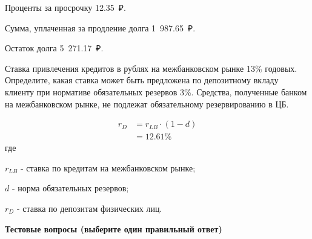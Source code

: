 \documentclass[12pt, table]{exam}
\begin{document}
\begin{questions}
\begin{subparts}
\begin{solution}[6em]
		Проценты за просрочку 12.35~₽.
		
		Сумма, уплаченная за продление долга 1~987.65~₽. 
		
		Остаток долга 5~271.17~₽.
	\end{solution}
	
\end{subparts}
\addpoints

\pagebreak
\question[10] Ставка привлечения кредитов в рублях на межбанковском рынке 13\% годовых. Определите, какая ставка может быть предложена по депозитному вкладу клиенту при нормативе обязательных резервов 3\%. Средства, полученные банком на межбанковском рынке, не подлежат обязательному резервированию в ЦБ.
\begin{solution}[10em]
	\begin{align}
	r_D&=r_{LB} \cdot (1-d)\\
	&=12.61\%\nonumber
	\end{align}
	где
	
	$r_{LB}$ - ставка по кредитам на межбанковском рынке;
	
	$d$ - норма обязательных резервов;
	
	$r_D$ - ставка по депозитам физических лиц.
	
\end{solution}
	
\end{questions}

\pagebreak
\noindent\textbf{Тестовые вопросы (выберите один правильный ответ)}
\end{document}
